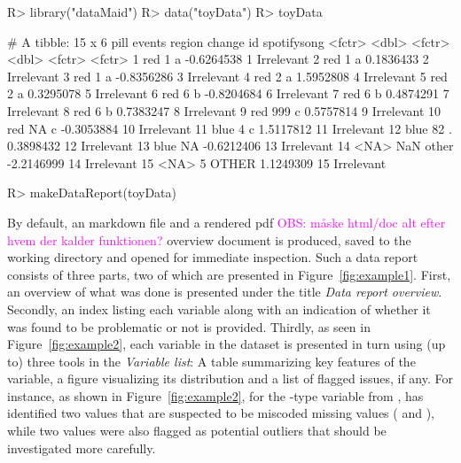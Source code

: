 \documentclass[article,shortnames]{jss}
\newcommand{\hl}[1]{\textcolor{magenta}{#1}}
\begin{document}
\begin{Schunk}
\begin{Sinput}
R> library("dataMaid")
R> data("toyData")
R> toyData
\end{Sinput}
\begin{Soutput}
# A tibble: 15 x 6
     pill events region     change     id spotifysong
   <fctr>  <dbl> <fctr>      <dbl> <fctr>      <fctr>
 1    red      1      a -0.6264538      1  Irrelevant
 2    red      1      a  0.1836433      2  Irrelevant
 3    red      1      a -0.8356286      3  Irrelevant
 4    red      2      a  1.5952808      4  Irrelevant
 5    red      2      a  0.3295078      5  Irrelevant
 6    red      6      b -0.8204684      6  Irrelevant
 7    red      6      b  0.4874291      7  Irrelevant
 8    red      6      b  0.7383247      8  Irrelevant
 9    red    999      c  0.5757814      9  Irrelevant
10    red     NA      c -0.3053884     10  Irrelevant
11   blue      4      c  1.5117812     11  Irrelevant
12   blue     82      .  0.3898432     12  Irrelevant
13   blue     NA        -0.6212406     13  Irrelevant
14   <NA>    NaN  other -2.2146999     14  Irrelevant
15   <NA>      5  OTHER  1.1249309     15  Irrelevant
\end{Soutput}
\end{Schunk}

\begin{Schunk}
\begin{Sinput}
R> makeDataReport(toyData)
\end{Sinput}
\end{Schunk}

By default, an  markdown file and a rendered pdf \hl{OBS: måske html/doc alt efter hvem der kalder funktionen?} overview
document is produced, saved to the working directory and
opened for immediate inspection. Such a data report consists of three parts, two of which 
are presented in Figure~\ref{fig:example1}. First, an overview of what was done is presented under the
title \textit{Data report overview}. Secondly, an index listing each variable along with an indication of whether it was found to be problematic or not is provided. Thirdly, as seen in Figure~\ref{fig:example2}, each variable in the
dataset is presented in turn using (up to) three tools in the
\textit{Variable list}: A table summarizing key features of the
variable, a figure visualizing its distribution and a
list of flagged issues, if any. For instance, as shown in Figure~\ref{fig:example2}, for the -type variable
 from ,  has identified two values that
are suspected to be miscoded missing values ( and ),
while two values were also flagged as potential outliers that should
be investigated more carefully.
\end{document}
